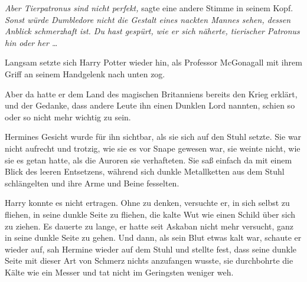 \emph{Aber Tierpatronus sind nicht perfekt,} sagte eine andere Stimme in seinem Kopf. \emph{Sonst würde Dumbledore nicht die Gestalt eines nackten Mannes sehen, dessen Anblick schmerzhaft ist. Du hast gespürt, wie er sich näherte, tierischer Patronus hin oder her …}

Langsam setzte sich Harry Potter wieder hin, als Professor McGonagall mit ihrem Griff an seinem Handgelenk nach unten zog.

Aber da hatte er dem Land des magischen Britanniens bereits den Krieg erklärt, und der Gedanke, dass andere Leute ihn einen Dunklen Lord nannten, schien so oder so nicht mehr wichtig zu sein.

Hermines Gesicht wurde für ihn sichtbar, als sie sich auf den Stuhl setzte. Sie war nicht aufrecht und trotzig, wie sie es vor Snape gewesen war, sie weinte nicht, wie sie es getan hatte, als die Auroren sie verhafteten. Sie saß einfach da mit einem Blick des leeren Entsetzens, während sich dunkle Metallketten aus dem Stuhl schlängelten und ihre Arme und Beine fesselten.

Harry konnte es nicht ertragen. Ohne zu denken, versuchte er, in sich selbst zu fliehen, in seine dunkle Seite zu fliehen, die kalte Wut wie einen Schild über sich zu ziehen. Es dauerte zu lange, er hatte seit Askaban nicht mehr versucht, ganz in seine dunkle Seite zu gehen. Und dann, als sein Blut etwas kalt war, schaute er wieder auf, sah Hermine wieder auf dem Stuhl und stellte fest, dass seine dunkle Seite mit dieser Art von Schmerz nichts anzufangen wusste, sie durchbohrte die Kälte wie ein Messer und tat nicht im Geringsten weniger weh.

